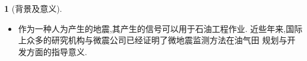 \documentclass[UTF8]{ctexbeamer}	%
\theoremstyle{plain}
\theoremstyle{definition}
\newtheorem{emt}{}[section]
\theoremstyle{remark}
\numberwithin{equation}{section}
\begin{document}
\begin{frame}
    \begin{emt}[背景及意义]
      
    \begin{itemize}
\item 作为一种人为产生的地震,其产生的信号可以用于石油工程作业.
近些年来,国际上众多的研究机构与微震公司已经证明了微地震监测方法在油气田
规划与开发方面的指导意义.

    \end{itemize}

    
\end{emt}
\end{frame}
\end{document}
